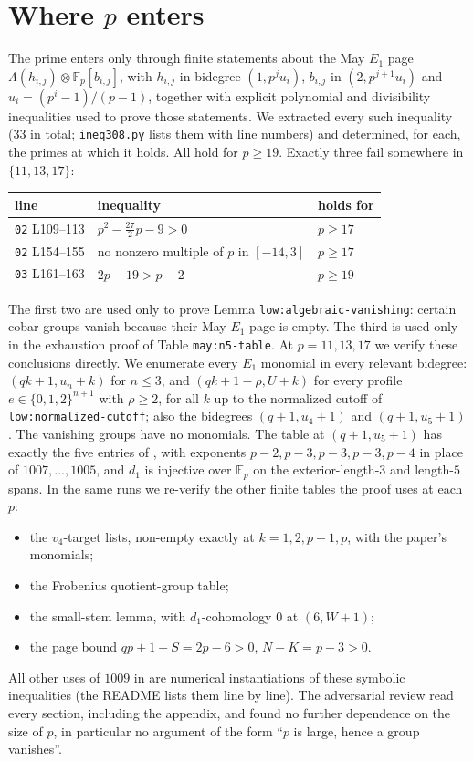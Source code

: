 \documentclass[11pt]{amsart}
\theoremstyle{remark}
\begin{document}
\section{Where $p$ enters}
The prime enters \cite{OAI308} only through finite statements about the May $E_1$ page
$\Lambda(h_{i,j})\otimes\mathbb F_p[b_{i,j}]$, with $h_{i,j}$ in bidegree $(1,p^ju_i)$,
$b_{i,j}$ in $(2,p^{j+1}u_i)$ and $u_i=(p^i-1)/(p-1)$, together with explicit polynomial and
divisibility inequalities used to prove those statements. We extracted every such inequality
(33 in total; \texttt{ineq308.py} lists them with line numbers) and determined, for each,
the primes at which it holds. All hold for $p\ge19$. Exactly three fail somewhere in
$\{11,13,17\}$:
\begin{center}
\begin{tabular}{lll}
\toprule
line & inequality & holds for\\\midrule
\texttt{02} L109--113 & $p^2-\tfrac{27}{2}p-9>0$ & $p\ge17$\\
\texttt{02} L154--155 & no nonzero multiple of $p$ in $[-14,3]$ & $p\ge17$\\
\texttt{03} L161--163 & $2p-19>p-2$ & $p\ge19$\\\bottomrule
\end{tabular}
\end{center}
The first two are used only to prove Lemma \texttt{low:algebraic-vanishing}: certain cobar groups
vanish because their May $E_1$ page is empty. The third is used only in the exhaustion proof of
Table \texttt{may:n5-table}. At $p=11,13,17$ we verify these conclusions directly. We enumerate every
$E_1$ monomial in every relevant bidegree: $(qk+1,u_n+k)$ for $n\le3$, and $(qk+1-\rho,U+k)$ for every
profile $e\in\{0,1,2\}^{n+1}$ with $\rho\ge2$, for all $k$ up to the normalized cutoff of
\texttt{low:normalized-cutoff}; also the bidegrees $(q+1,u_4+1)$ and $(q+1,u_5+1)$. The vanishing groups
have no monomials. The table at $(q+1,u_5+1)$ has exactly the five entries of \cite{OAI308}, with
exponents $p-2,p-3,p-3,p-3,p-4$ in place of $1007,\dots,1005$, and $d_1$ is injective over $\mathbb F_p$
on the exterior-length-$3$ and length-$5$ spans. In the same runs we re-verify the other finite
tables the proof uses at each $p$:
\begin{itemize}
\item the $v_4$-target lists, non-empty exactly at $k=1,2,p-1,p$, with the paper's monomials;
\item the Frobenius quotient-group table;
\item the small-stem lemma, with $d_1$-cohomology $0$ at $(6,W+1)$;
\item the page bound $qp+1-S=2p-6>0$, $N-K=p-3>0$.
\end{itemize}
All other uses of $1009$ in \cite{OAI308} are numerical instantiations of these symbolic
inequalities (the README lists them line by line). The adversarial review read every section,
including the appendix, and found no further dependence on the size of $p$, in particular no
argument of the form ``$p$ is large, hence a group vanishes''.
\end{document}
